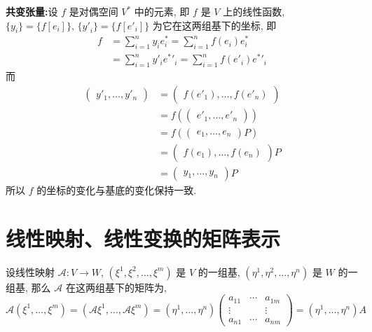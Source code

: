 \documentclass{book}
\begin{document}
        \textbf{共变张量:}设 $f$ 是对偶空间 $V^*$ 中的元素, 即 $f$ 是 $V$ 上的线性函数, $\{y_i\} = \{f[e_i]\},\,\{{y'}_i\} = \{f[{e'}_i]\}$ 为它在这两组基下的坐标, 即
        \begin{align*}
            f &= \sum_{i=1}^{n}y_i e^*_i = \sum_{i=1}^{n}f(e_i)e^*_i \\
            &= \sum_{i=1}^{n}y'_i {e^*}'_i = \sum_{i=1}^{n}f(e'_i){e^*}'_i
        \end{align*}
        而
        \begin{align*}
            \begin{pmatrix}
                y'_1, \dots, y'_n
            \end{pmatrix} &= 
            \begin{pmatrix}
                f(e'_1), \dots, f(e'_n)
            \end{pmatrix} \\
            &= f\left(
                \begin{pmatrix}
                    {e'}_1,\dots,{e'}_n
                \end{pmatrix}
            \right) \\
            &= f\left(
                \begin{pmatrix}
                    e_1,\dots,e_n
                \end{pmatrix} P
            \right) \\
            &= \begin{pmatrix}
                f(e_1), \dots, f(e_n)
            \end{pmatrix}P \\
            &= \begin{pmatrix}
                y_1, \dots, y_n
            \end{pmatrix}P
        \end{align*}
        所以 $f$ 的坐标的变化与基底的变化保持一致.
    
    \section{线性映射、线性变换的矩阵表示}

        设线性映射 $\mathcal{A}:V\rightarrow W$, $(\xi^1,\xi^2,\dots,\xi^m)$ 是 $V$ 的一组基, $(\eta^1,\eta^2,\dots,\eta^n)$ 是 $W$ 的一组基, 那么 $\mathcal{A}$ 在这两组基下的矩阵为,
        \begin{equation*}
            \mathcal{A}(\xi^1,\dots,\xi^m)=(\mathcal{A}\xi^1,\dots,\mathcal{A}\xi^m)=(\eta^1,\dots,\eta^n)
            \begin{pmatrix}
                a_{11} & \cdots & a_{1m} \\
                \vdots &        & \vdots \\
                a_{n1} & \cdots & a_{nm}
            \end{pmatrix} = (\eta^1,\dots,\eta^n)A
        \end{equation*}
\end{document}
